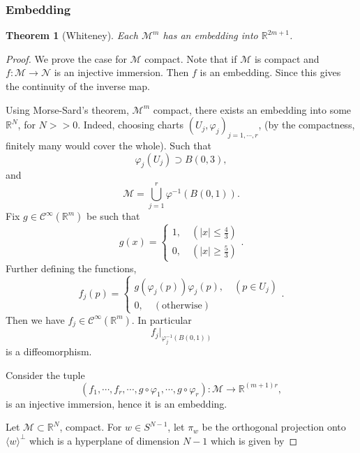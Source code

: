 \documentclass[10pt]{article}
\newtheorem{theorem}{Theorem} [section]
\newcommand{\R}[0]{\mathbb{R}}
\newcommand{\M}[0]{\mathcal{M}}
\newcommand{\maniN}[0]{\mathcal{N}}
\begin{document}
\subsubsection{Embedding}
\begin{theorem}[Whiteney]
  Each $\M^m$ has an embedding into $\R^{2m+1}$. 
\end{theorem}
\begin{proof}
  We prove the case for $\M$ compact. Note that if $\M$ is compact and $f:\M\to\maniN$ is an injective immersion. Then $f$ is an embedding. Since this gives the continuity of the inverse map. 
  \par Using Morse-Sard's theorem, $\M^m$ compact, there exists an embedding into some $\R^N$, for $N>>0$. Indeed, choosing charts $(U_j,\varphi_j)_{j=1,\cdots,r}$, (by the compactness, finitely many would cover the whole). Such that 
  \begin{equation*}
    \varphi_j(U_j)\supset B(0,3),
  \end{equation*}
  and
  \begin{equation*}
    \M = \bigcup_{j=1}^r\varphi^{-1}(B(0,1)).
  \end{equation*}
  Fix $g\in\mathcal{C}^\infty (\R^m)$ be such that 
  \begin{equation*}
    g(x) = \begin{cases}
      1,\quad (\vert x\vert\leq{\frac 4 3})\\
      0,\quad (\vert x\vert\geq{\frac 5 3})
    \end{cases}.
  \end{equation*}
  Further defining the functions,
  \begin{equation*}
    f_j(p) = \begin{cases}
      g(\varphi_j(p))\varphi_j(p),\quad (p\in U_j)\\
      0,\quad(\text{otherwise})
    \end{cases}.
  \end{equation*}
  Then we have $f_j\in\mathcal{C}^\infty(\R^m)$. In particular 
  \begin{equation*}
    f_j|_{\varphi_j^{-1}(B(0,1))}
  \end{equation*}
  is a diffeomorphism.
  \par Consider the tuple 
  \begin{equation*}
    (f_1,\cdots,f_r,\cdots,g\circ\varphi_1,\cdots,g\circ\varphi_r) : \M\to\R^{(m+1)r},
  \end{equation*}
  is an injective immersion, hence it is an embedding.
  \par Let $\M\subset\R^N$, compact. For $w\in S^{N-1}$, let $\pi_w$ be the orthogonal projection onto $\langle w\rangle^\perp$ which is a hyperplane of dimension $N-1$ which is given by 

\end{proof}
\end{document}
